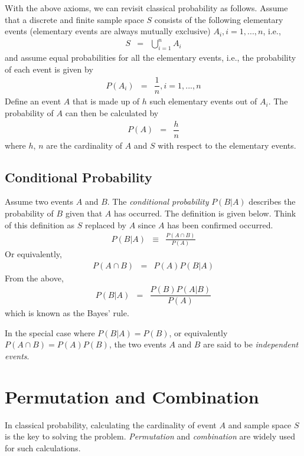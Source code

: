 With the above axioms, we can revisit classical probability as follows. Assume that a discrete and finite sample space $S$ consists of the following elementary events (elementary events are always mutually exclusive) $A_i, i=1,...,n$, i.e.,
\begin{eqnarray}
  S &=& \bigcup_{i=1}^{n} A_i \nonumber
\end{eqnarray}
and assume equal probabilities for all the elementary events, i.e., the probability of each event is given by
\begin{eqnarray}
  P(A_i) &=& \dfrac{1}{n}, i=1,...,n \nonumber
\end{eqnarray}
Define an event $A$ that is made up of $h$ such elementary events out of $A_i$. The probability of $A$ can then be calculated by
\begin{eqnarray}
  P(A) &=& \dfrac{h}{n} \nonumber
\end{eqnarray}
where $h$, $n$ are the cardinality of $A$ and $S$ with respect to the elementary events.

\subsection{Conditional Probability}

Assume two events $A$ and $B$. The \textit{conditional probability} $P(B|A)$ describes the probability of $B$ given that $A$ has occurred. The definition is given below. Think of this definition as $S$ replaced by $A$ since $A$ has been confirmed occurred.
\begin{eqnarray}
  P(B|A) &\equiv& \frac{P(A\cap B)}{P(A)} \nonumber
\end{eqnarray}
Or equivalently,
\begin{eqnarray}
  P(A\cap B) &=& P(A)P(B|A) \nonumber
\end{eqnarray}
From the above,
\begin{eqnarray}
  P(B|A) &=& \dfrac{P(B)P(A|B)}{P(A)} \nonumber
\end{eqnarray}
which is known as the Bayes' rule.

In the special case where $P(B|A)=P(B)$, or equivalently $P(A\cap B) = P(A)P(B)$, the two events $A$ and $B$ are said to be \textit{independent events}.

\section{Permutation and Combination}

In classical probability, calculating the cardinality of event $A$ and sample space $S$ is the key to solving the problem. \textit{Permutation} and \textit{combination} are widely used for such calculations.

